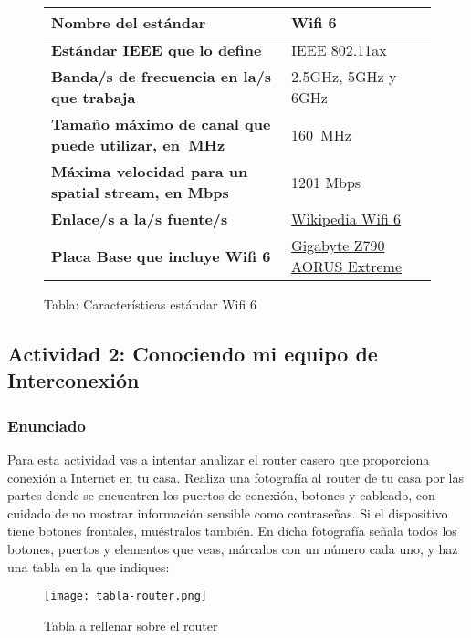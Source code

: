 \begin{figure}[H]

    \vspace{3ex}
    \centering

    \setlength{\tabcolsep}{10pt}
    \renewcommand{\arraystretch}{1.4}

    \begin{tabular}{| l | l |}
        \hline
        \textbf{Nombre del estándar}  & Wifi 6 \\ \hline
        \textbf{Estándar IEEE que lo define} & IEEE 802.11ax   \\ \hline
        \textbf{Banda/s de frecuencia en la/s que trabaja} & 2.5GHz, 5GHz y 6GHz \\ \hline
        \textbf{Tamaño máximo de canal que puede utilizar, en MHz} & 160 MHz    \\ \hline
        \textbf{Máxima velocidad para un spatial stream, en Mbps} & 1201 Mbps \\ \hline
        \textbf{Enlace/s a la/s fuente/s} & \href{https://en.wikipedia.org/wiki/Wi-Fi_6}{Wikipedia Wifi 6}  \\ \hline
        \textbf{Placa Base que incluye Wifi 6} & \href{https://www.gigabyte.com/Motherboard/Z790-AORUS-XTREME-rev-10/sp#sp}{Gigabyte Z790 AORUS Extreme}   \\ \hline
    \end{tabular}
    \caption{Tabla: Características estándar Wifi 6}
\end{figure}

\subsection{Actividad 2: Conociendo mi equipo de Interconexión}

\subsubsection{Enunciado}
Para esta actividad vas a intentar analizar el router casero que proporciona conexión a Internet en tu casa. Realiza una fotografía al router de tu casa por las partes donde se encuentren los puertos de conexión, botones y cableado, con cuidado de no mostrar información sensible como contraseñas. Si el dispositivo tiene botones frontales, muéstralos también. En dicha fotografía señala todos los botones, puertos y elementos que veas, márcalos con un número cada uno, y haz una tabla en la que indiques:

\begin{figure}[H]
    \centering
    \texttt{[image: tabla-router.png]}
    \caption{Tabla a rellenar sobre el router}
\end{figure}


